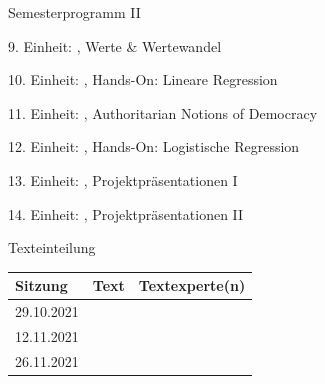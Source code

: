 \documentclass[11pt]{beamer}
\begin{document}
\begin{frame}[t]{Semesterprogramm II}
	\begin{nolist}
		\item[9.] Einheit: , Werte \& Wertewandel		
		\item[10.] Einheit: , Hands-On: Lineare Regression \pause
		\item[11.] Einheit: , Authoritarian Notions of Democracy
		\item[12.] Einheit: , Hands-On: Logistische Regression \pause
		\item[13.] Einheit: , Projektpräsentationen I
		\item[14.] Einheit: , Projektpräsentationen II 
	\end{nolist}
\end{frame}

\begin{frame}[t]{Texteinteilung}
	\begin{center}	
		\begin{table}
			\begin{tabular}{l l l}
			\toprule[2pt]
			Sitzung & Text & Textexperte(n)\\
			\midrule
			\multirow{2}{*}{29.10.2021} &\cite{Easton1975} & \\
			\cmidrule{2-3}
			& \cite{Fuhse2005} & \\
			\midrule
			\multirow{3}{*}{12.11.2021} & \cite[Kap. 1]{Almond1963} & \\
			\cmidrule{2-3}
			& \cite[Kap. 15]{Almond1963} & \\
			\cmidrule{2-3}
			& \cite{Gabriel2009} & \\
			\midrule
			\multirow{4}{*}{26.11.2021} & \cite{Festenstein2019} & \\
			\cmidrule{2-3}
			& \cite{Zmerli2020}  & \\
			\cmidrule{2-3}
			& \cite{Hooghe2017} & \\
			\bottomrule[2pt]
			\end{tabular}
		\end{table}
	\end{center}
\end{frame}
\end{document}

